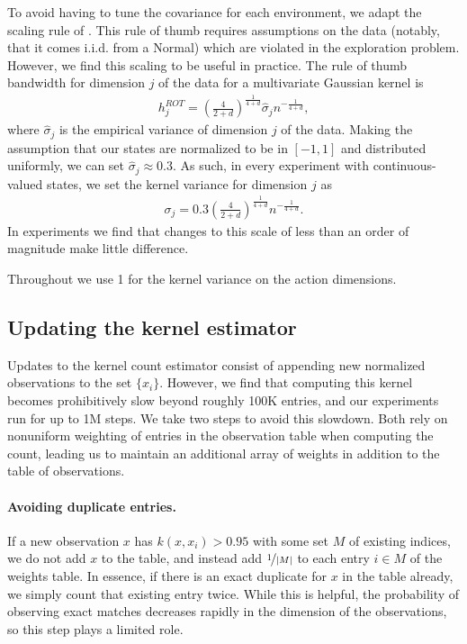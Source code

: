 To avoid having to tune the covariance for each environment, we adapt the scaling rule of \citep{Henderson2012NormalRB}.
This rule of thumb requires assumptions on the data (notably, that it comes i.i.d. from a Normal) which are violated in the exploration problem.
However, we find this scaling to be useful in practice.
The rule of thumb bandwidth for dimension $j$ of the data for a multivariate Gaussian kernel is
\begin{align}
    h_j^{ROT} = \left( \frac{4}{2+d}  \right) ^ \frac{1}{4+d} \hat{\sigma}_j n ^ {- \frac{1}{4+d}},
\end{align}
where $\hat{\sigma}_j$ is the empirical variance of dimension $j$ of the data.
Making the assumption that our states are normalized to be in $[-1, 1]$ and distributed uniformly, we can set $\hat{\sigma}_j \approx 0.3$.
As such, in every experiment with continuous-valued states, we set the kernel variance for dimension $j$ as
\begin{align}
    \sigma_j = 0.3 \left( \frac{4}{2+d} \right) ^ \frac{1}{4+d} n ^ {- \frac{1}{4+d}} .
\end{align}
In experiments we find that changes to this scale of less than an order of magnitude make little difference.

Throughout we use 1 for the kernel variance on the action dimensions.

\subsection{Updating the kernel estimator}
Updates to the kernel count estimator consist of appending new normalized observations to the set $\{x_i\}$.
However, we find that computing this kernel becomes prohibitively slow beyond roughly 100K entries, and our experiments run for up to 1M steps.
We take two steps to avoid this slowdown.
Both rely on nonuniform weighting of entries in the observation table when computing the count, leading us to maintain an additional array of weights in addition to the table of observations.

\paragraph{Avoiding duplicate entries.}
If a new observation $x$ has $k(x, x_i) > 0.95$ with some set $M$ of existing indices, we do not add $x$ to the table, and instead add $\nicefrac{1}{|M|}$ to each entry $i \in M$ of the weights table.
In essence, if there is an exact duplicate for $x$ in the table already, we simply count that existing entry twice.
While this is helpful, the probability of observing exact matches decreases rapidly in the dimension of the observations, so this step plays a limited role.

